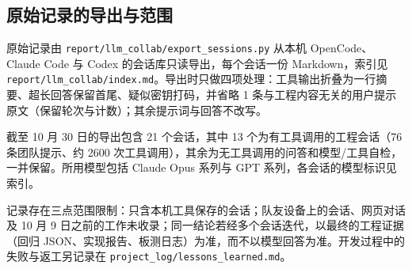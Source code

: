 \Needspace{85pt}

\subsection{原始记录的导出与范围}

原始记录由 \texttt{report/\allowbreak{}llm\_\allowbreak{}collab/\allowbreak{}export\_\allowbreak{}sessions.\allowbreak{}py} 从本机 OpenCode、Claude Code 与 Codex 的会话库只读导出，每个会话一份 Markdown，索引见 \texttt{report/\allowbreak{}llm\_\allowbreak{}collab/\allowbreak{}index.\allowbreak{}md}。导出时只做四项处理：工具输出折叠为一行摘要、超长回答保留首尾、疑似密钥打码，并省略 1 条与工程内容无关的用户提示原文（保留轮次与计数）；其余提示词与回答不改写。

截至 10 月 30 日的导出包含 21 个会话，其中 13 个为有工具调用的工程会话（76 条团队提示、约 2600 次工具调用），其余为无工具调用的问答和模型/工具自检，一并保留。所用模型包括 Claude Opus 系列与 GPT 系列，各会话的模型标识见索引。

记录存在三点范围限制：只含本机工具保存的会话；队友设备上的会话、网页对话及 10 月 9 日之前的工作未收录；同一结论若经多个会话迭代，以最终的工程证据（回归 JSON、实现报告、板测日志）为准，而不以模型回答为准。开发过程中的失败与返工另记录在 \texttt{project\_\allowbreak{}log/\allowbreak{}lessons\_\allowbreak{}learned.\allowbreak{}md}。
